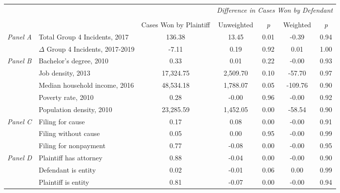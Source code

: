 \begin{tabular}{llccccc}
\toprule
 &  & \textit{} & \multicolumn{4}{c}{\textit{Difference in Cases Won by Defendant}} \\
\cline{4-7}
\\
 &  & Cases Won by Plaintiff & Unweighted & \emph{p} & Weighted & \emph{p} \\
\midrule
\multirow[c]{2}{3cm}{\textit{Panel A}} & Total Group 4 Incidents, 2017 & 136.38 & 13.45 & 0.01 & -0.39 & 0.94 \\
 & $\Delta$ Group 4 Incidents, 2017-2019 & -7.11 & 0.19 & 0.92 & 0.01 & 1.00 \\
\cline{1-7}
\multirow[c]{5}{3cm}{\textit{Panel B}} & Bachelor's degree, 2010 & 0.33 & 0.01 & 0.22 & -0.00 & 0.93 \\
 & Job density, 2013 & 17,324.75 & 2,509.70 & 0.10 & -57.70 & 0.97 \\
 & Median household income, 2016 & 48,534.18 & 1,788.07 & 0.05 & -109.76 & 0.90 \\
 & Poverty rate, 2010 & 0.28 & -0.00 & 0.96 & -0.00 & 0.92 \\
 & Population density, 2010 & 23,285.59 & 1,452.05 & 0.00 & -58.54 & 0.90 \\
\cline{1-7}
\multirow[c]{3}{3cm}{\textit{Panel C}} & Filing for cause & 0.17 & 0.08 & 0.00 & -0.00 & 0.91 \\
 & Filing without cause & 0.05 & 0.00 & 0.95 & -0.00 & 0.99 \\
 & Filing for nonpayment & 0.77 & -0.08 & 0.00 & -0.00 & 0.95 \\
\cline{1-7}
\multirow[c]{3}{3cm}{\textit{Panel D}} & Plaintiff has attorney & 0.88 & -0.04 & 0.00 & -0.00 & 0.90 \\
 & Defendant is entity & 0.02 & -0.01 & 0.06 & 0.00 & 0.99 \\
 & Plaintiff is entity & 0.81 & -0.07 & 0.00 & -0.00 & 0.94 \\
\cline{1-7}
\bottomrule
\end{tabular}
